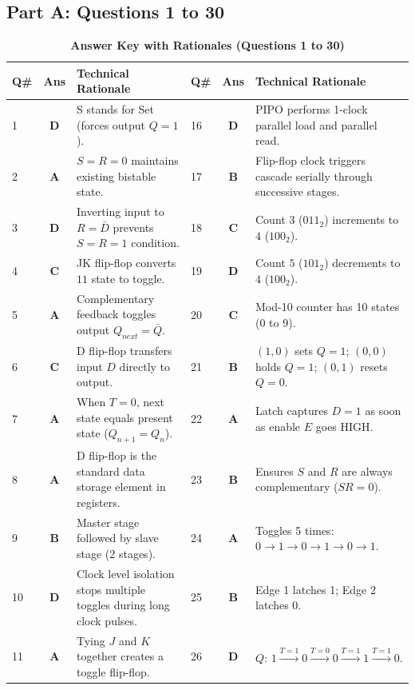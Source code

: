 \subsection*{Part A: Questions 1 to 30}
\begin{table}[htbp]
\centering
\caption{\textbf{Answer Key with Rationales (Questions 1 to 30)}}
\vspace{2mm}
\small
\begin{tabularx}{\textwidth}{l c X l c X}
\toprule
\textbf{Q\#} & \textbf{Ans} & \textbf{Technical Rationale} & \textbf{Q\#} & \textbf{Ans} & \textbf{Technical Rationale} \\
\midrule
1 & \textbf{D} & S stands for Set (forces output $Q=1$). & 16 & \textbf{D} & PIPO performs 1-clock parallel load and parallel read. \\
2 & \textbf{A} & $S=R=0$ maintains existing bistable state. & 17 & \textbf{B} & Flip-flop clock triggers cascade serially through successive stages. \\
3 & \textbf{D} & Inverting input to $R = \bar{D}$ prevents $S=R=1$ condition. & 18 & \textbf{C} & Count $3$ ($011_2$) increments to $4$ ($100_2$). \\
4 & \textbf{C} & JK flip-flop converts $11$ state to toggle. & 19 & \textbf{D} & Count $5$ ($101_2$) decrements to $4$ ($100_2$). \\
5 & \textbf{A} & Complementary feedback toggles output $Q_{next} = \bar{Q}$. & 20 & \textbf{C} & Mod-10 counter has 10 states ($0$ to $9$). \\
6 & \textbf{C} & D flip-flop transfers input $D$ directly to output. & 21 & \textbf{B} & $(1,0)$ sets $Q=1$; $(0,0)$ holds $Q=1$; $(0,1)$ resets $Q=0$. \\
7 & \textbf{A} & When $T=0$, next state equals present state ($Q_{n+1}=Q_n$). & 22 & \textbf{A} & Latch captures $D=1$ as soon as enable $E$ goes HIGH. \\
8 & \textbf{A} & D flip-flop is the standard data storage element in registers. & 23 & \textbf{B} & Ensures $S$ and $R$ are always complementary ($SR=0$). \\
9 & \textbf{B} & Master stage followed by slave stage (2 stages). & 24 & \textbf{A} & Toggles 5 times: $0 \to 1 \to 0 \to 1 \to 0 \to 1$. \\
10 & \textbf{D} & Clock level isolation stops multiple toggles during long clock pulses. & 25 & \textbf{B} & Edge 1 latches 1; Edge 2 latches 0. \\
11 & \textbf{A} & Tying $J$ and $K$ together creates a toggle flip-flop. & 26 & \textbf{D} & $Q$: $1 \xrightarrow{T=1} 0 \xrightarrow{T=0} 0 \xrightarrow{T=1} 1 \xrightarrow{T=1} 0$. \\

\end{tabularx}
\end{table}

